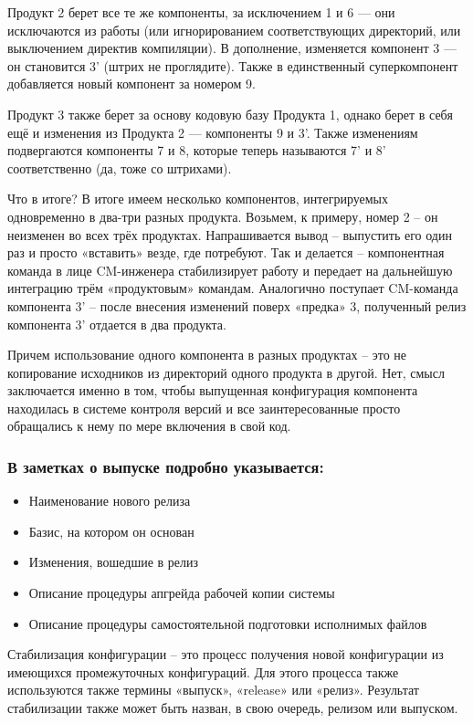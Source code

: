 \documentclass{../industrial-development}
\begin{document}
Продукт 2 берет все те же компоненты, за исключением 1 и 6 — они исключаются из работы (или игнорированием соответствующих директорий, или выключением директив компиляции). В дополнение, изменяется компонент 3 — он становится 3' (штрих не проглядите). Также в единственный суперкомпонент добавляется новый компонент за номером 9.

Продукт 3 также берет за основу кодовую базу Продукта 1, однако берет в себя ещё и изменения из Продукта 2 — компоненты 9 и 3'. Также изменениям подвергаются компоненты 7 и 8, которые теперь называются 7' и 8' соответственно (да, тоже со штрихами).

Что в итоге? В итоге имеем несколько компонентов, интегрируемых одновременно в два-три разных продукта. Возьмем, к примеру, номер 2 – он неизменен во всех трёх продуктах. Напрашивается вывод – выпустить его один раз и просто «вставить» везде, где потребуют. Так и делается – компонентная команда в лице CM-инженера стабилизирует работу и передает на дальнейшую интеграцию трём «продуктовым» командам. Аналогично поступает CM-команда компонента 3’ – после внесения изменений поверх «предка» 3, полученный релиз компонента 3’ отдается в два продукта.

Причем использование одного компонента в разных продуктах – это не копирование исходников из директорий одного продукта в другой. Нет, смысл заключается именно в том, чтобы выпущенная конфигурация компонента находилась в системе контроля версий и все заинтересованные просто обращались к нему по мере включения в свой код.
~\cite{Configurations}
\begin{frame} \frametitle{В заметках о выпуске подробно указывается:}
  
  \begin{itemize}
\item Наименование нового релиза
\item Базис, на котором он основан
\item Изменения, вошедшие в релиз
\item Описание процедуры апгрейда рабочей копии системы
\item Описание процедуры самостоятельной подготовки исполнимых файлов

  \end{itemize}
\end{frame}

\lecturenotes

Стабилизация конфигурации – это процесс получения новой конфигурации из имеющихся промежуточных конфигураций. Для этого процесса также используются также термины «выпуск», «release» или «релиз». Результат стабилизации также может быть назван, в свою очередь, релизом или выпуском.
\end{document}
